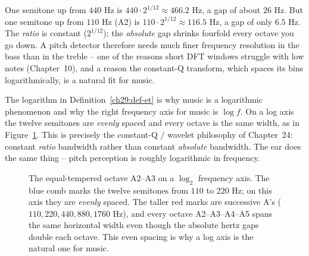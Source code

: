 \begin{example}
\label{ch29:ex-spacing}
One semitone up from $440$ Hz is $440\cdot 2^{1/12} \approx 466.2$ Hz, a gap of about $26$ Hz. But
one semitone up from $110$ Hz (A2) is $110\cdot 2^{1/12}\approx 116.5$ Hz, a gap of only $6.5$ Hz. The
\emph{ratio} is constant ($2^{1/12}$); the \emph{absolute} gap shrinks fourfold every octave you go
down. A pitch detector therefore needs much finer frequency resolution in the bass than in the
treble -- one of the reasons short DFT windows struggle with low notes (Chapter~10), and a reason the
constant-Q transform, which spaces its bins logarithmically, is a natural fit for music.
\end{example}

\begin{connectionbox}
The logarithm in Definition~\ref{ch29:def-et} is why music is a logarithmic phenomenon and why the
right frequency axis for music is $\log f$. On a log axis the twelve semitones are \emph{evenly}
spaced and every octave is the same width, as in Figure~\ref{ch29:fig-logaxis}. This is precisely the constant-Q / wavelet philosophy of
Chapter~24: constant \emph{ratio} bandwidth rather than constant \emph{absolute} bandwidth. The ear
does the same thing -- pitch perception is roughly logarithmic in frequency.
\end{connectionbox}

\begin{figure}[H]
\centering
{}
\caption{The equal-tempered octave A2--A3 on a $\log_2$ frequency axis. The blue comb marks the twelve
semitones from $110$ to $220$ Hz; on this axis they are \emph{evenly} spaced. The taller red marks are
successive A's ($110, 220, 440, 880, 1760$ Hz), and every octave A2--A3--A4--A5 spans the same
horizontal width even though the absolute hertz gaps double each octave. This even spacing is why a log
axis is the natural one for music.}
\label{ch29:fig-logaxis}
\end{figure}

